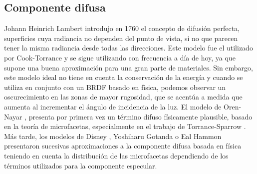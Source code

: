     \subsection{Componente difusa}
        Johann Heinrich Lambert introdujo en 1760 \autocite{lambert} el concepto de difusi\'on perfecta, superficies cuya radiancia no
        dependen del punto de vista, si no que parecen tener la misma radiancia desde todas las direcciones. Este modelo fue el utilizado
        por Cook-Torrance \autocite{cooktorrance} y se sigue utilizando con frecuencia a d\'ia de hoy, ya que supone una buena
        aproximaci\'on para una gran parte de materiales. Sin embargo, este modelo ideal no tiene en cuenta la conservaci\'on
        de la energ\'ia y cuando se utiliza en conjunto con un BRDF basado en f\'isica, podemos observar un oscurecimiento
        en las zonas de mayor rugosidad, que se acent\'ua a medida que aumenta al incrementar el \'angulo de incidencia de la luz.
        El modelo de Oren-Nayar \autocite{orennayar}, presenta por primera vez un t\'ermino difuso f\'isicamente plausible,
        basado en la teor\'ia de microfacetas, especialmente en el trabajo de Torrance-Sparrow \autocite{torrancesparrow}. M\'as
        tarde, los modelos de Disney \autocite{disney12} \autocite{disney15}, Yoshiharu Gotanda \autocite{gotanda14} o Eal Hammon
        \autocite{earlhammon} presentaron sucesivas aproximaciones a la componente difusa basada en f\'isica teniendo en cuenta la
        distribuci\'on de las microfacetas dependiendo de los t\'erminos utilizados para la componente especular.



